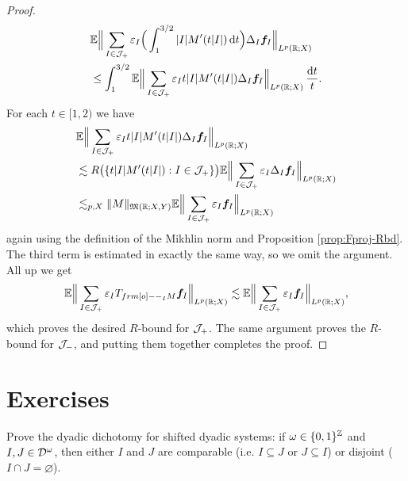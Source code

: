 \begin{proof}
\begin{equation*}
\begin{aligned}
    &\mathbb{E} \Big\| \sum_{I \in \mathcal{J}_{+}} \varepsilon_{I} \Big( \int_{1}^{3/2} |I|  M'(t|I|) \, \mathrm{d} t \Big)\Delta_{I} \bm{f}_{I} \Big\|_{L^p(\mathbb{R};X)} \\
    &\leq \int_{1}^{3/2} \mathbb{E} \Big\| \sum_{I \in \mathcal{J}_{+}} \varepsilon_{I} t|I|  M'(t|I|)\Delta_{I} \bm{f}_{I} \Big\|_{L^p(\mathbb{R};X)} \, \frac{\mathrm{d} t}{t}.
  \end{aligned}
\end{equation*}
For each $t \in [1,2)$ we have
\begin{equation*}
  \begin{aligned}
    &\mathbb{E} \Big\| \sum_{I \in \mathcal{J}_{+}} \varepsilon_{I} t|I|  M'(t|I|)\Delta_{I} \bm{f}_{I} \Big\|_{L^p(\mathbb{R};X)} \\
    &\lesssim R\big( \{ t|I|  M'(t|I|) : I \in \mathcal{J}_{+}\} \big) \mathbb{E} \Big\| \sum_{I \in \mathcal{J}_{+}} \varepsilon_{I} \Delta_{I} \bm{f}_{I} \Big\|_{L^p(\mathbb{R};X)} \\
    &\lesssim_{p,X} \|M\|_{\mathfrak{M}(\mathbb{R};X,Y)} \mathbb{E} \Big\| \sum_{I \in \mathcal{J}_{+}} \varepsilon_{I} \bm{f}_{I} \Big\|_{L^p(\mathbb{R};X)}
  \end{aligned}
\end{equation*}
again using the definition of the Mikhlin norm and Proposition \ref{prop:Fproj-Rbd}.
The third term is estimated in exactly the same way, so we omit the argument.
All up we get
\begin{equation*}
  \begin{aligned}
    \E \Big\| \sum_{I \in \mc{J}_{+}} \varepsilon_{I} T_{\1_{I} M} \mb{f}_{I} \Big\|_{L^p(\R;X)} \lesssim \E \Big\|\sum_{I \in \mc{J}_{+}} \varepsilon_{I} \mb{f}_{I} \Big\|_{L^p(\R;X)},
  \end{aligned}
\end{equation*}
which proves the desired $R$-bound for $\mathcal{J}_{+}$.
The same argument proves the $R$-bound for $\mathcal{J}_{-}$, and putting them together completes the proof.
\end{proof}


\section{Exercises}

\begin{exercise}\label{ex:dyadic-dichotomy}
  Prove the dyadic dichotomy for shifted dyadic systems: if $\omega \in \{0,1\}^{\mathbb{Z}}$ and $I,J \in \mathcal{D}^{\omega}$, then either $I$ and $J$ are comparable (i.e. $I \subseteq J$ or $J \subseteq I$) or disjoint ($I \cap J = \varnothing$).
\end{exercise}

